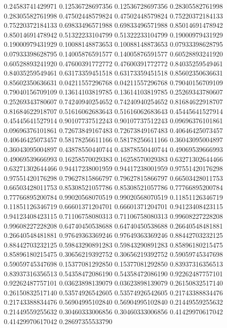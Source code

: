    0.24583741429971   0.12536728697356
   0.12536728697356   0.28305582761998
   0.28305582761998   0.47502448579824
   0.47502448579824   0.75220372184133
   0.75220372184133   0.69833496571988
   0.69833496571988   0.85014691478942
   0.85014691478942   0.51322233104799
   0.51322233104799   0.19000979431929
   0.19000979431929   0.10088148873653
   0.10088148873653   0.07933398628795
   0.07933398628795   0.14005876591577
   0.14005876591577   0.60528893241920
   0.60528893241920   0.47600391772772
   0.47600391772772   0.84035259549461
   0.84035259549461   0.63173359451518
   0.63173359451518   0.85602350636631
   0.85602350636631   0.04211557296768
   0.04211557296768   0.79040156709109
   0.79040156709109   0.13614103819785
   0.13614103819785   0.25269343780607
   0.25269343780607   0.74240940254652
   0.74240940254652   0.81684622918707
   0.81684622918707   0.51616062683643
   0.51616062683643   0.45445641527914
   0.45445641527914   0.90107737512243
   0.90107737512243   0.09696376101861
   0.09696376101861   0.72673849167483
   0.72673849167483   0.40646425073457
   0.40646425073457   0.58178256611166
   0.58178256611166   0.36043095004897
   0.36043095004897   0.43878550440744
   0.43878550440744   0.49069539666993
   0.49069539666993   0.16258570029383
   0.16258570029383   0.63271302644466
   0.63271302644466   0.94417238001959
   0.94417238001959   0.97551420176298
   0.97551420176298   0.79627815866797
   0.79627815866797   0.66503428011753
   0.66503428011753   0.85308521057786
   0.85308521057786   0.77766895200784
   0.77766895200784   0.99020568070519
   0.99020568070519   0.11851126346719
   0.11851126346719   0.66601371204701
   0.66601371204701   0.94123408423115
   0.94123408423115   0.71106758080313
   0.71106758080313   0.99608227228208
   0.99608227228208   0.64740450538688
   0.64740450538688   0.26640548481881
   0.26640548481881   0.97649363369246
   0.97649363369246   0.88442703232125
   0.88442703232125   0.59843290891283
   0.59843290891283   0.85896180215475
   0.85896180215475   0.30656219392752
   0.30656219392752   0.59059745347698
   0.59059745347698   0.15377081292850
   0.15377081292850   0.83937316356513
   0.83937316356513   0.54358472086190
   0.54358472086190   0.92262487757101
   0.92262487757101   0.03623898139079
   0.03623898139079   0.26150832517140
   0.26150832517140   0.53574926542605
   0.53574926542605   0.21743388834476
   0.21743388834476   0.56904995102840
   0.56904995102840   0.21449559255632
   0.21449559255632   0.30460333006856
   0.30460333006856   0.41429970617042
   0.41429970617042   0.28697355533790

